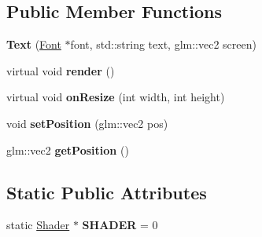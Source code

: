 \subsection*{Public Member Functions}
\begin{DoxyCompactItemize}
\item 
\hypertarget{class_text_ae77cabfcffef90b4a499f7c9f4f389ed}{}{\bfseries Text} (\hyperlink{class_font}{Font} $\ast$font, std\+::string text, glm\+::vec2 screen)\label{class_text_ae77cabfcffef90b4a499f7c9f4f389ed}

\item 
\hypertarget{class_text_a8a365f1337c52ee44e006bd59b82ff28}{}virtual void {\bfseries render} ()\label{class_text_a8a365f1337c52ee44e006bd59b82ff28}

\item 
\hypertarget{class_text_ab79897712890e561aadd14f38b3c64aa}{}virtual void {\bfseries on\+Resize} (int width, int height)\label{class_text_ab79897712890e561aadd14f38b3c64aa}

\item 
\hypertarget{class_text_ae479c13afc074e0b214a838bf27630aa}{}void {\bfseries set\+Position} (glm\+::vec2 pos)\label{class_text_ae479c13afc074e0b214a838bf27630aa}

\item 
\hypertarget{class_text_ae7d2d73938fedf4ea508b1eb827c72cd}{}glm\+::vec2 {\bfseries get\+Position} ()\label{class_text_ae7d2d73938fedf4ea508b1eb827c72cd}

\end{DoxyCompactItemize}
\subsection*{Static Public Attributes}
\begin{DoxyCompactItemize}
\item 
\hypertarget{class_text_a748a0c099aad9bec820278c28a3f4213}{}static \hyperlink{class_shader}{Shader} $\ast$ {\bfseries S\+H\+A\+D\+E\+R} = 0\label{class_text_a748a0c099aad9bec820278c28a3f4213}

\end{DoxyCompactItemize}

